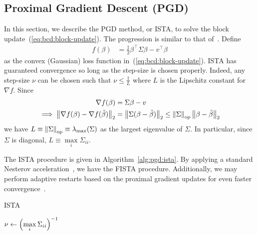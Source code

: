 \subsection{Proximal Gradient Descent (PGD)}\label{ssec:pgd}

In this section, we describe the PGD method, or ISTA,
to solve the block update~(\ref{eq:bcd:block-update}).
The progression is similar to that of~\citet{sls:2016}.
Define
\begin{align*}
    f(\beta)
    &=
    \frac{1}{2} \beta^\top \Sigma \beta
    - v^\top \beta
\end{align*}
as the convex (Gaussian) loss function in~(\ref{eq:bcd:block-update}).
ISTA has guaranteed convergence so long as the step-size is chosen properly.
Indeed, any step-size $\nu$ can be chosen such that
$\nu \leq \frac{1}{L}$ where $L$ is the Lipschitz constant for $\nabla f$.
Since 
\begin{align}
    \nabla f(\beta)
    &=
    \Sigma \beta - v
    \label{eq:pgd:nablaf}
    \\\implies
    \left\|
        \nabla f(\beta)
        - \nabla f(\tilde{\beta})
    \right\|_2
    &=
    \left\|\Sigma (\beta - \tilde{\beta})\right\|_2
    \leq
    \left\|\Sigma\right\|_{\text{op}} \left\|\beta-\tilde{\beta}\right\|_2
    \nonumber
\end{align}
we have $L \equiv \left\|\Sigma\right\|_{\text{op}} \equiv \lambda_{\max}(\Sigma)$ as the largest eigenvalue of $\Sigma$.
In particular, since $\Sigma$ is diagonal, $L \equiv \max\limits_{i} \Sigma_{ii}$.

The ISTA procedure is given in Algorithm~\ref{alg:pgd:ista}.
By applying a standard Nesterov acceleration~\citep{beck:2009}, 
we have the FISTA procedure. %
Additionally, we may perform adaptive restarts
based on the proximal gradient updates
for even faster convergence~\citep{odonoghue:2015}. %

\begin{algorithm}[t]
    \caption{ISTA}\label{alg:pgd:ista}
    $\nu \gets \left(\max\limits_{i} \Sigma_{ii}\right)^{-1}$\;
\end{algorithm}


